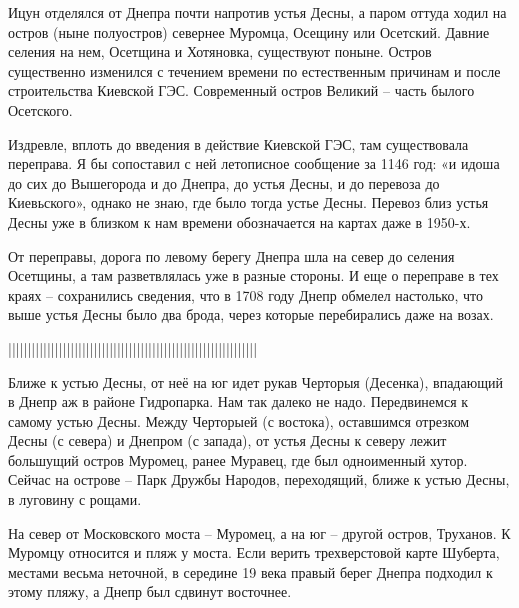 Ицун отделялся от Днепра почти напротив устья Десны, а паром оттуда ходил на остров (ныне полуостров) севернее Муромца, Осещину или Осетский. Давние селения на нем, Осетщина и Хотяновка, существуют поныне. Остров существенно изменился с течением времени по естественным причинам и после строительства Киевской ГЭС. Современный остров Великий – часть былого Осетского.

Издревле, вплоть до введения в действие Киевской ГЭС, там существовала переправа. Я бы сопоставил с ней летописное сообщение за 1146 год: «и идоша до сих до Вышегорода и до Днепра, до устья Десны, и до перевоза до Киевьского», однако не знаю, где было тогда устье Десны. Перевоз близ устья Десны уже в близком к нам времени обозначается на картах даже в 1950-х.

От переправы, дорога по левому берегу Днепра шла на север до селения Осетщины, а там разветвлялась уже в разные стороны. И еще о переправе в тех краях – сохранились сведения, что в 1708 году Днепр обмелел настолько, что выше устья Десны было два брода, через которые перебирались даже на возах.



























||||||||||||||||||||||||||||||||||||||||||||||||||||||||||||||||

Ближе к устью Десны, от неё на юг идет рукав Черторыя (Десенка), впадающий в Днепр аж в районе Гидропарка. Нам так далеко не надо. Передвинемся к самому устью Десны. Между Черторыей (с востока), оставшимся отрезком Десны (с севера) и Днепром (с запада), от устья Десны к северу лежит большущий остров Муромец, ранее Муравец, где был одноименный хутор. Сейчас на острове – Парк Дружбы Народов, переходящий, ближе к устью Десны, в луговину с рощами.

На север от Московского моста – Муромец, а на юг – другой остров, Труханов. К Муромцу относится и пляж у моста. Если верить трехверстовой карте Шуберта, местами весьма неточной, в середине 19 века правый берег Днепра подходил к этому пляжу, а Днепр был сдвинут восточнее.

